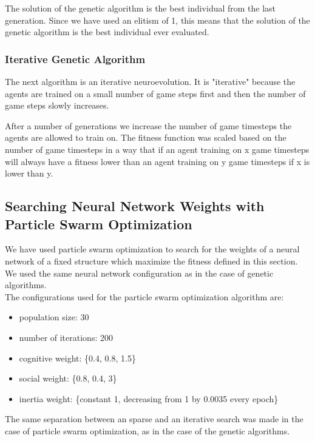 \documentclass[conference]{IEEEtran}
\begin{document}
    The solution of the genetic algorithm is the best individual from the last generation.
    Since we have used an elitism of 1, this means that the solution of the genetic algorithm is
    the best individual ever evaluated.

    \subsubsection{Iterative Genetic Algorithm}
    The next algorithm is an iterative neuroevolution.
    It is "iterative" because the agents are trained on a small number of game steps
    first and then the number of game steps slowly increases.

    After a number of generations we increase the number of game timesteps the agents are allowed to train on.
    The fitness function was scaled based on the number of game timesteps in a way that if an agent
    training on x game timesteps will always have a fitness lower than an agent training on y game
    timesteps if x is lower than y.

    \subsection{Searching Neural Network Weights with Particle Swarm Optimization}\label{subsec:searching-neural-network-weights-with-particle-swarm-optimization}
    We have used particle swarm optimization\cite{pso} to search for the weights of a neural network of a
    fixed structure which maximize the fitness defined in this section.
    We used the same neural network configuration as in the case of genetic algorithms. \\

    The configurations used for the particle swarm optimization\cite{pso} algorithm are:
    \begin{itemize}
        \item population size: 30
        \item number of iterations: 200
        \item cognitive weight: \{0.4, 0.8, 1.5\}
        \item social weight: \{0.8, 0.4, 3\}
        \item inertia weight: \{constant 1, decreasing from 1 by 0.0035 every epoch\}
    \end{itemize}

    The same separation between an sparse and an iterative search was made in the case
    of particle swarm optimization, as in the case of the genetic algorithms.
\end{document}
